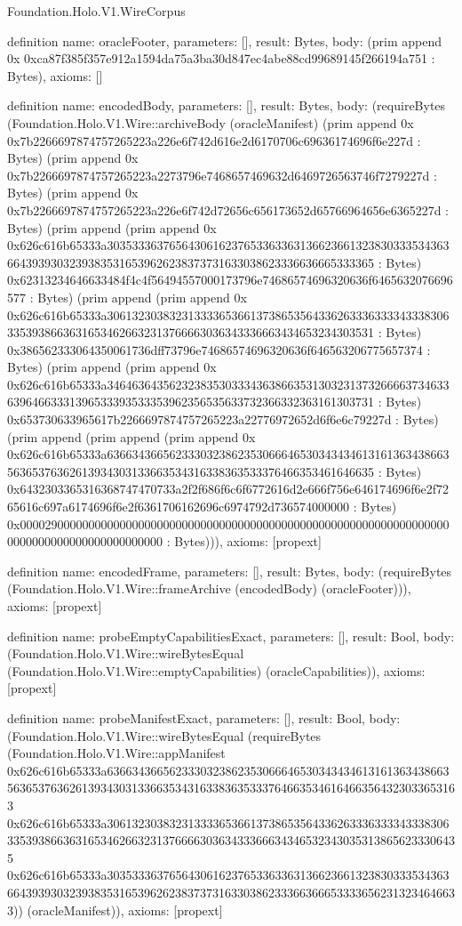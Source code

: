 \begin{lexlean}{Foundation.Holo.V1.WireCorpus}
\begin{semanticmodule}
definition{
  name: oracleFooter,
  parameters: [],
  result: Bytes,
  body: (prim append 0x 0xca87f385f357e912a1594da75a3ba30d847ec4abe88cd99689145f266194a751 : Bytes),
  axioms: []
}

definition{
  name: encodedBody,
  parameters: [],
  result: Bytes,
  body: (requireBytes (Foundation.Holo.V1.Wire::archiveBody (oracleManifest) (prim append 0x 0x7b2266697874757265223a226e6f742d616e2d6170706c69636174696f6e227d : Bytes) (prim append 0x 0x7b2266697874757265223a2273796e7468657469632d6469726563746f7279227d : Bytes) (prim append 0x 0x7b2266697874757265223a226e6f742d72656c656173652d65766964656e6365227d : Bytes) (prim append (prim append 0x 0x626c616b65333a303533363765643061623765336336313662366132383033353436366439393032393835316539626238373731633038623336636665333365 : Bytes) 0x62313234646633484f4c4f56494557000173796e74686574696320636f6465632076696577 : Bytes) (prim append (prim append 0x 0x626c616b65333a306132303832313333653661373865356433626333633334333830633539386636316534626632313766663036343336663434653234303531 : Bytes) 0x386562333064350061736dff73796e74686574696320636f646563206775657374 : Bytes) (prim append (prim append 0x 0x626c616b65333a346463643562323835303334363866353130323137326666373463363964663331396533393533353962356535633732366332363161303731 : Bytes) 0x653730633965617b2266697874757265223a22776972652d6f6e6c79227d : Bytes) (prim append (prim append (prim append 0x 0x626c616b65333a636634366562333032386235306664653034343461316136343866356365376362613934303133663534316338363533376466353461646635 : Bytes) 0x6432303365316368747470733a2f2f686f6c6f6772616d2e666f756e646174696f6e2f7265616c697a6174696f6e2f6361706162696c6974792d736574000000 : Bytes) 0x0000290000000000000000000000000000000000000000000000000000000000000000000000000000000000000000 : Bytes))),
  axioms: [propext]
}

definition{
  name: encodedFrame,
  parameters: [],
  result: Bytes,
  body: (requireBytes (Foundation.Holo.V1.Wire::frameArchive (encodedBody) (oracleFooter))),
  axioms: [propext]
}

definition{
  name: probeEmptyCapabilitiesExact,
  parameters: [],
  result: Bool,
  body: (Foundation.Holo.V1.Wire::wireBytesEqual (Foundation.Holo.V1.Wire::emptyCapabilities) (oracleCapabilities)),
  axioms: [propext]
}

definition{
  name: probeManifestExact,
  parameters: [],
  result: Bool,
  body: (Foundation.Holo.V1.Wire::wireBytesEqual (requireBytes (Foundation.Holo.V1.Wire::appManifest 0x626c616b65333a63663436656233303238623530666465303434346131613634386635636537636261393430313366353431633836353337646635346164663564323033653163 0x626c616b65333a30613230383231333365366137386535643362633363333433383063353938663631653462663231376666303634333666343465323430353138656233306435 0x626c616b65333a30353336376564306162376533633631366236613238303335343636643939303239383531653962623837373163303862333663666533336562313234646633)) (oracleManifest)),
  axioms: [propext]
}


\end{semanticmodule}
\end{lexlean}
